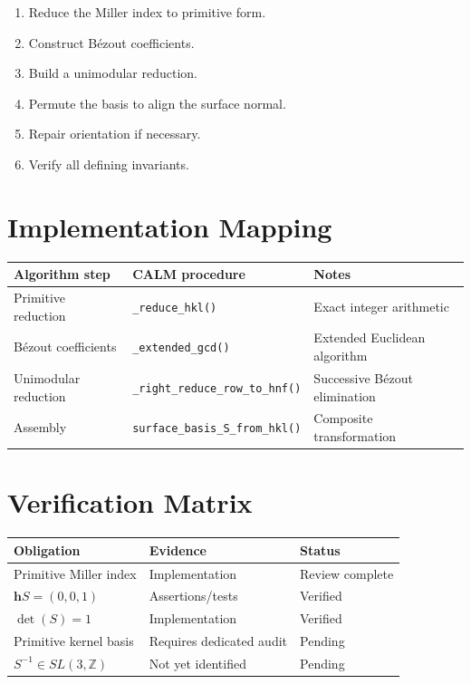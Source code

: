 \begin{enumerate}
\item Reduce the Miller index to primitive form.
\item Construct Bézout coefficients.
\item Build a unimodular reduction.
\item Permute the basis to align the surface normal.
\item Repair orientation if necessary.
\item Verify all defining invariants.
\end{enumerate}

\section{Implementation Mapping}

\begin{center}
\begin{tabular}{lll}
\hline
Algorithm step & CALM procedure & Notes\\
\hline
Primitive reduction & \texttt{\_reduce\_hkl()} & Exact integer arithmetic\\
Bézout coefficients & \texttt{\_extended\_gcd()} & Extended Euclidean algorithm\\
Unimodular reduction & \texttt{\_right\_reduce\_row\_to\_hnf()} & Successive Bézout elimination\\
Assembly & \texttt{surface\_basis\_S\_from\_hkl()} & Composite transformation\\
\hline
\end{tabular}
\end{center}

\section{Verification Matrix}

\begin{center}
\begin{tabular}{lll}
\hline
Obligation & Evidence & Status\\
\hline
Primitive Miller index & Implementation & Review complete\\
$\mathbf hS=(0,0,1)$ & Assertions/tests & Verified\\
$\det(S)=1$ & Implementation & Verified\\
Primitive kernel basis & Requires dedicated audit & Pending\\
$S^{-1}\in SL(3,\mathbb Z)$ & Not yet identified & Pending\\
\hline
\end{tabular}
\end{center}

